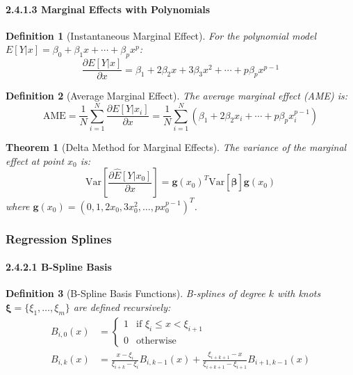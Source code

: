 \documentclass{article}
\newtheorem{definition}{Definition}
\newtheorem{theorem}{Theorem}
\begin{document}
\paragraph{2.4.1.3 Marginal Effects with Polynomials}

\begin{definition}[Instantaneous Marginal Effect]
For the polynomial model $E[Y|x] = \beta_0 + \beta_1x + \cdots + \beta_px^p$:
\begin{equation}
\frac{\partial E[Y|x]}{\partial x} = \beta_1 + 2\beta_2x + 3\beta_3x^2 + \cdots + p\beta_px^{p-1}
\end{equation}
\end{definition}

\begin{definition}[Average Marginal Effect]
The average marginal effect (AME) is:
\begin{equation}
\text{AME} = \frac{1}{N}\sum_{i=1}^N \frac{\partial E[Y|x_i]}{\partial x} = \frac{1}{N}\sum_{i=1}^N \left(\beta_1 + 2\beta_2x_i + \cdots + p\beta_px_i^{p-1}\right)
\end{equation}
\end{definition}

\begin{theorem}[Delta Method for Marginal Effects]
The variance of the marginal effect at point $x_0$ is:
\begin{equation}
\text{Var}\left[\frac{\partial \hat{E}[Y|x_0]}{\partial x}\right] = \mathbf{g}(x_0)^T \text{Var}[\hat{\boldsymbol{\beta}}] \mathbf{g}(x_0)
\end{equation}
where $\mathbf{g}(x_0) = (0, 1, 2x_0, 3x_0^2, \ldots, px_0^{p-1})^T$.
\end{theorem}

\subsubsection{Regression Splines}

\paragraph{2.4.2.1 B-Spline Basis}

\begin{definition}[B-Spline Basis Functions]
B-splines of degree $k$ with knots $\boldsymbol{\xi} = \{\xi_1, \ldots, \xi_m\}$ are defined recursively:
\begin{align}
B_{i,0}(x) &= \begin{cases}
1 & \text{if } \xi_i \leq x < \xi_{i+1} \\
0 & \text{otherwise}
\end{cases} \\
B_{i,k}(x) &= \frac{x - \xi_i}{\xi_{i+k} - \xi_i}B_{i,k-1}(x) + \frac{\xi_{i+k+1} - x}{\xi_{i+k+1} - \xi_{i+1}}B_{i+1,k-1}(x)
\end{align}
\end{definition}
\end{document}
